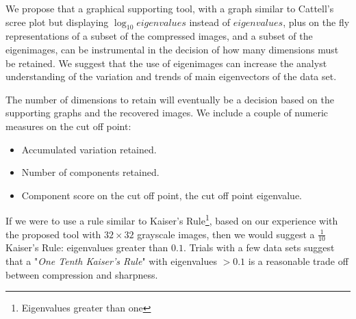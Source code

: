 \documentclass{article} %
\begin{document}
We propose that a graphical supporting tool, with a graph similar to Cattell's scree plot but displaying $\log_{10} eigenvalues$ instead of $eigenvalues$, plus on the fly representations of a subset of the compressed images, and a subset of the eigenimages, can be instrumental in the decision of how many dimensions must be retained. We suggest that the use of eigenimages can increase the analyst understanding of the variation and trends of main eigenvectors of the data set.\par
The number of dimensions to retain will eventually be a decision based on the supporting graphs and the recovered images. We include a couple of numeric measures on the cut off point:
\begin{itemize}
\item Accumulated variation retained.
\item Number of components retained.
\item Component score on the cut off point, the cut off point eigenvalue.
\end{itemize}
If we were to use a rule similar to Kaiser's Rule\footnote{Eigenvalues greater than one}, based on our experience with the proposed tool with $32\times 32$ grayscale images, then we would suggest a $\frac{1}{10}$ Kaiser's Rule: eigenvalues greater than $0.1$. Trials with a few data sets suggest that a "\emph{One Tenth Kaiser's Rule}" with eigenvalues $> 0.1$ is a reasonable trade off between compression and sharpness.

\end{document}

